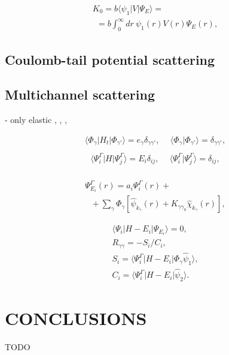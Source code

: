 \documentclass[aip
, pra
, showpacs
, aps
, twocolumn
, groupedaddress
, floatfix
]{revtex4}
\newcommand{\beq}{\begin{equation}}
\newcommand{\eeq}{\end{equation}}
\newcommand{\barr}{\begin{array}}
\newcommand{\earr}{\end{array}}
\begin{document}
\beq \barr{l}
K_0 = b \langle \psi_1 | V | \Psi_E \rangle =\\
\ \ = b \int_0^\infty  dr\ \psi_1(r) V(r) \Psi_E(r),
\earr \eeq




\subsection{Coulomb-tail potential scattering}

\subsection{Multichannel scattering}
\cite{CA73} - only elastic
\cite{NO72},
\cite{TF79},
\cite{Nesbet78}, \cite{Lucchese86}

\beq \barr{ll}
\langle \Phi_\gamma|H_t|\Phi_{\gamma'}\rangle=e_\gamma \delta_{\gamma\gamma'}, \ \
& \langle \Phi_\gamma|\Phi_{\gamma'}\rangle=\delta_{\gamma\gamma'},\\
\earr \label{psi_H_psi} \eeq
\beq \barr{ll}
\langle\Psi_i^\Gamma|H|\Psi_j^\Gamma\rangle=E_i\delta_{ij}, \ \
& \langle\Psi_i^\Gamma|\Psi_j^\Gamma\rangle=\delta_{ij},\\
\earr \label{Psi_H_Psi_JM} \eeq


\beq \barr{l}
\Psi_{E_i}^{\Gamma}(r) = a_i \Psi_i^\Gamma(r) + \\
\ \ \ + \sum_{\gamma} \Phi_{\gamma} [ \hat{\psi}_{k_\gamma}(r)
 +  K_{\gamma \gamma_0}  \hat{\chi}_{k_\gamma}(r)],
\earr \label{Psi_EES} \eeq


\beq \barr{l}
\langle\Psi_i|H-E_i|\Psi_{E_i}\rangle=0,\\
R_{\gamma \gamma} = - S_i / C_i, \\
S_i = \langle\Psi_i^{\Gamma}|H-E_i|   \Phi_{\gamma} \hat{\psi}_1 \rangle, \\
C_i = \langle\Psi_i^{\Gamma}|H-E_i|  \hat{\psi}_2 \rangle.
\earr \eeq


\section{CONCLUSIONS}
TODO


\begin{acknowledgments}
\end{acknowledgments}





%
\end{document}
